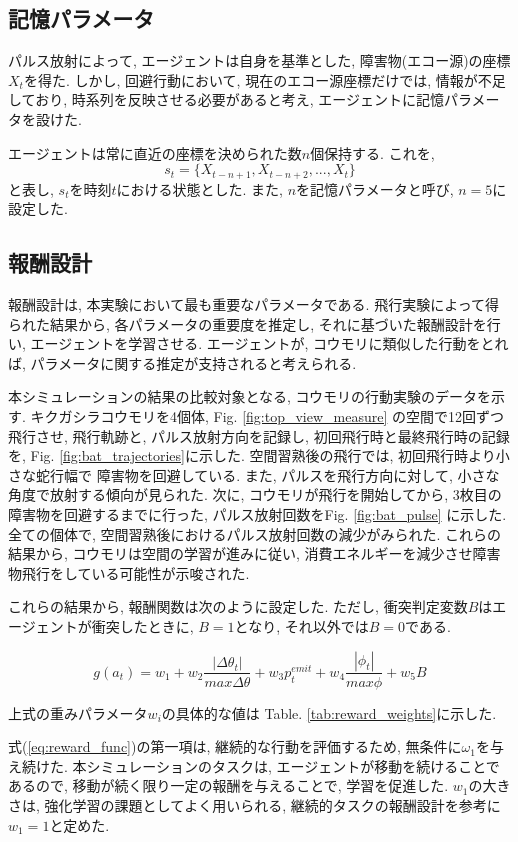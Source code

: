 \documentclass[../main]{subfiles}
\begin{document}
\subsection{記憶パラメータ}
パルス放射によって, エージェントは自身を基準とした, 
障害物(エコー源)の座標$X_t$を得た. 
しかし, 回避行動において, 現在のエコー源座標だけでは, 
情報が不足しており, 時系列を反映させる必要があると考え, 
エージェントに記憶パラメータを設けた.

エージェントは常に直近の座標を決められた数$n$個保持する. 
これを, 
$$
s_t = \{X_{t-n+1}, X_{t-n+2}, ..., X_t\}
$$
と表し, $s_t$を時刻$t$における状態とした.
また, $n$を記憶パラメータと呼び, $n=5$に設定した.

\subsection{報酬設計}
報酬設計は, 本実験において最も重要なパラメータである.
飛行実験によって得られた結果から, 各パラメータの重要度を推定し, 
それに基づいた報酬設計を行い, エージェントを学習させる. 
エージェントが, コウモリに類似した行動をとれば, 
パラメータに関する推定が支持されると考えられる.

本シミュレーションの結果の比較対象となる, 
コウモリの行動実験のデータを示す.
キクガシラコウモリを4個体, Fig. \ref{fig:top_view_measure}
の空間で12回ずつ飛行させ, 
飛行軌跡と, パルス放射方向を記録し, 
初回飛行時と最終飛行時の記録を, 
Fig. \ref{fig:bat_trajectories}に示した.
空間習熟後の飛行では, 初回飛行時より小さな蛇行幅で
障害物を回避している. 
また, パルスを飛行方向に対して, 
小さな角度で放射する傾向が見られた.
次に, コウモリが飛行を開始してから, 
3枚目の障害物を回避するまでに行った, 
パルス放射回数をFig. \ref{fig:bat_pulse}
に示した.
全ての個体で, 空間習熟後におけるパルス放射回数の減少がみられた.
これらの結果から, コウモリは空間の学習が進みに従い, 
消費エネルギーを減少させ障害物飛行をしている可能性が示唆された.

これらの結果から, 報酬関数は次のように設定した. 
ただし, 衝突判定変数$B$はエージェントが衝突したときに, $B=1$となり, 
それ以外では$B=0$である.

\begin{equation}
\label{eq:reward_func}
 g(a_t) = 
w_1 +
w_2 \frac{|\Delta\theta_t|}{max \Delta\theta} +
w_3 p^{emit}_t +
w_4 \frac{|\phi_t|}{max \phi} +
w_5 B
\end{equation}

上式の重みパラメータ$w_i$の具体的な値は
Table. \ref{tab:reward_weights}に示した.

式(\ref{eq:reward_func})の第一項は, 
継続的な行動を評価するため, 無条件に$\omega_1$を与え続けた.
本シミュレーションのタスクは, 
エージェントが移動を続けることであるので, 
移動が続く限り一定の報酬を与えることで, 学習を促進した.
$w_1$の大きさは, 強化学習の課題としてよく用いられる, 
継続的タスクの報酬設計を参考に$w_1=1$と定めた.
\end{document}
